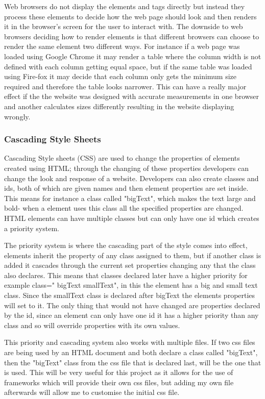 \documentclass[12pt]{article}  %
\begin{document}
\noindent Web browsers do not display the elements and tags directly \cite{w3_introduction_nodate} but instead they process these elements to decide how the web page should look and then renders it in the browser's screen for the user to interact with. The downside to web browsers deciding how to render elements is that different browsers can choose to render the same element two different ways. For instance if a web page was loaded using Google Chrome it may render a table where the column width is not defined with each column getting equal space, but if the same table was loaded using Fire-fox it may decide that each column only gets the minimum size required and therefore the table looks narrower. This can have a really major effect if the the website was designed with accurate measurements in one browser and another calculates sizes differently resulting in the website displaying wrongly.    


\subsubsection{Cascading Style Sheets}
Cascading Style sheets (CSS)\cite{lie_cascading_2005} are used to change the properties of elements created using HTML; through the changing of these properties developers can change the look and response of a website. Developers can also create classes and ids, both of which are given names and then element properties are set inside. This means for instance a class called "bigText", which makes the text large and bold- when a element uses this class all the specified properties are changed. HTML elements can have multiple classes but can only have one id which creates a priority system. 

The priority system \cite{noauthor_cascading_nodate} is where the cascading part of the style comes into effect, elements inherit the property of any class assigned to them, but if another class is added it cascades through the current set properties changing any that the class also declares. This means that classes declared later have a higher priority for example class=" bigText smallText", in this the element has a big and small text class. Since the smallText class is declared after bigText the elements properties will set to it. The only thing that would not have changed are properties declared by the id, since an element can only have one id it has a higher priority than any class and so will override properties with its own values.  

This priority and cascading system also works with multiple files. If two css files are being used by an HTML document and both declare a class called "bigText", then the "bigText" class from the css file that is declared last, will be the one that is used. This will be very useful for this project as it allows for the use of frameworks which will provide their own css files, but adding my own file afterwards will allow me to customise the initial css file.
\end{document}
